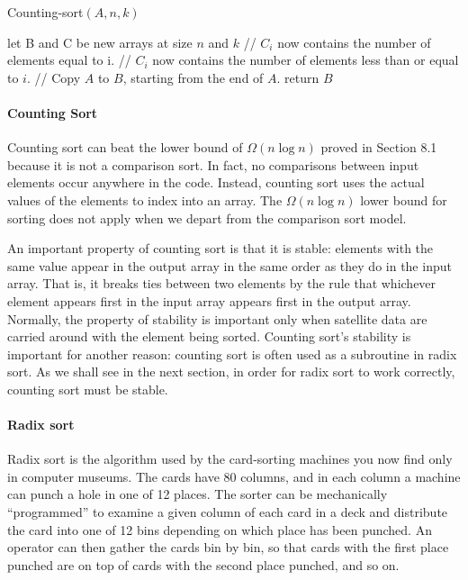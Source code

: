 \begin{algbox}{Counting-sort$(A, n, k)$}
  \begin{algorithm}[H]
  	let B and C be new arrays at size $n$ and $k$
	// $C_{i}$ now contains the number of elements equal to i.
	// $C_{i}$ now contains the number of elements less than or equal to $i$.
	// Copy $A$ to $B$, starting from the end of $A$.
	  return $B$
  \end{algorithm}
\end{algbox}

\paragraph{Counting Sort}
Counting sort can beat the lower bound of $\Omega\left(n \log n\right)$ proved in Section 8.1 because it is not a comparison sort. In fact, no comparisons between input elements occur anywhere in the code. Instead, counting sort uses the actual values of the elements to index into an array. The $\Omega\left(n \log n\right)$ lower bound for sorting does not apply when we depart from the comparison sort model.

An important property of counting sort is that it is stable: elements with the same value appear in the output array in the same order as they do in the input array. That is, it breaks ties between two elements by the rule that whichever element appears first in the input array appears first in the output array. Normally, the property of stability is important only when satellite data are carried around with the element being sorted. Counting sort’s stability is important for another reason: counting sort is often used as a subroutine in radix sort. As we shall see in the next section, in order for radix sort to work correctly, counting sort must be stable.

\paragraph{Radix sort}
Radix sort is the algorithm used by the card-sorting machines you now find only in computer museums. The cards have 80 columns, and in each column a machine can punch a hole in one of 12 places. The sorter can be mechanically “programmed” to examine a given column of each card in a deck and distribute the card into one of 12 bins depending on which place has been punched. An operator can then gather the cards bin by bin, so that cards with the first place punched are on top of cards with the second place punched, and so on.

